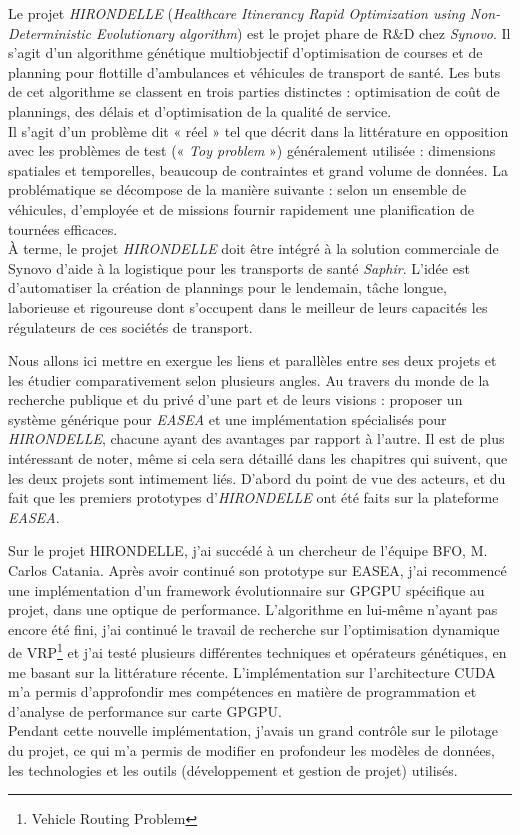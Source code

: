 \documentclass[french, 11pt]{memoir}
\begin{document}
Le projet \emph{HIRONDELLE} (\textit{Healthcare Itinerancy Rapid Optimization
using Non-Deterministic Evolutionary algorithm}) est le projet phare de
R\&D chez \emph{Synovo}. Il s'agit d'un algorithme génétique
multiobjectif d'optimisation de courses et de planning pour flottille
d'ambulances et véhicules de transport de santé. Les buts de cet
algorithme se classent en trois parties distinctes : optimisation de
coût de plannings, des délais et d'optimisation de la qualité de
service.\\
Il s'agit d'un problème dit « réel » tel que décrit dans la
littérature en opposition avec les problèmes de test (« \emph{Toy
problem\cite{zitzler2000comparison}} ») généralement utilisée : dimensions spatiales et temporelles,
beaucoup de contraintes et grand volume de données. La problématique se
décompose de la manière suivante : selon un ensemble de véhicules,
d'employée et de missions fournir rapidement une planification de
tournées efficaces.\\
À terme, le projet \emph{HIRONDELLE} doit être
intégré à la solution commerciale de Synovo d'aide à la logistique pour
les transports de santé \emph{Saphir}. L'idée est d'automatiser la
création de plannings pour le lendemain, tâche longue, laborieuse et
rigoureuse dont s'occupent dans le meilleur de leurs capacités les
régulateurs de ces sociétés de transport.

\bigskip
Nous allons ici mettre en
exergue les liens et parallèles entre ses deux projets et les étudier
comparativement selon plusieurs angles. Au travers du monde de la
recherche publique et du privé d'une part et de leurs visions : proposer
un système générique pour \emph{EASEA} et une implémentation spécialisés
pour \textit{HIRONDELLE}, chacune ayant des avantages par rapport à l'autre. Il
est de plus intéressant de noter, même si cela sera détaillé dans les
chapitres qui suivent, que les deux projets sont intimement liés.
D'abord du point de vue des acteurs, et du fait que les premiers
prototypes d'\textit{HIRONDELLE} ont été faits sur la plateforme \emph{EASEA}.

\bigskip
Sur le projet HIRONDELLE, j'ai succédé à un chercheur de l'équipe BFO, M.
Carlos Catania. Après avoir continué son prototype sur EASEA, j'ai
recommencé une implémentation d'un framework évolutionnaire sur GPGPU
spécifique au projet, dans une optique de performance. L'algorithme en
lui-même n'ayant pas encore été fini, j'ai continué le travail de
recherche sur l'optimisation dynamique de VRP\cite{branke1999evolutionary,hanshar2007dynamic}\footnote{Vehicle Routing Problem} et j'ai testé
plusieurs différentes techniques et opérateurs génétiques, en me basant
sur la littérature récente. L'implémentation sur l'architecture CUDA m'a
permis d'approfondir mes compétences en matière de programmation et
d'analyse de performance sur carte GPGPU. \\
Pendant cette nouvelle implémentation, j'avais un grand contrôle sur le
pilotage du projet, ce qui m'a permis de modifier en profondeur les
modèles de données, les technologies et les outils (développement et
gestion de projet) utilisés.
\end{document}
